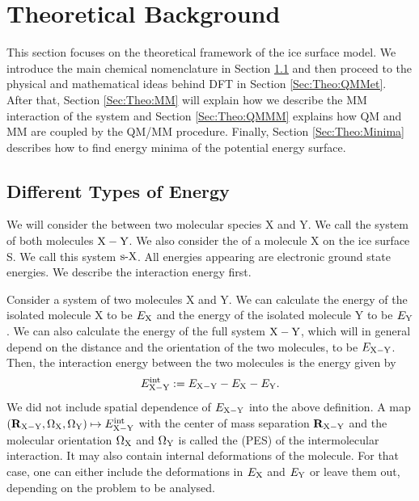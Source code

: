 \documentclass[8.5pt,twoside,twocolumn]{article}
\newcommand\eint{\enmat{E^{\te{int}}}}
\newcommand\sur{\enmat{\te{s-}}}
\theoremstyle{standard}
\begin{document}
\section{Theoretical Background}
\label{Sec:Theo}
This section focuses on the theoretical framework of the ice surface model. We introduce the main chemical
nomenclature in Section \ref{Sec:Theo:Interaction} and then proceed to the
physical and mathematical ideas behind DFT in Section \ref{Sec:Theo:QMMet}.
After that, Section \ref{Sec:Theo:MM} will explain how we describe the MM
interaction of the system and Section \ref{Sec:Theo:QMMM} explains how QM and
MM are coupled by the QM/MM procedure. Finally, Section \ref{Sec:Theo:Minima}
describes how to find energy minima of the potential energy surface.

\newcommand\X{\enmat{\te X}}
\newcommand\Y{\enmat{\te Y}}
\newcommand\Z{\enmat{\te Z}}
\newcommand\XY{{\enmat{{\X - \Y}}}}
\renewcommand\S{\enmat{\te S}}
\newcommand\sX{\enmat{{\sur\te{X}}}}
\newcommand\A{\enmat{\te A}}
\subsection{Different Types of Energy}
\label{Sec:Theo:Interaction}
We will consider the  between two molecular species X and Y. We call
the system of both molecules $\XY$. We also consider the  of a molecule X on
the ice surface S. We call this system $\sX$. All energies appearing are
electronic ground state energies. We describe the interaction energy first.

Consider a system of two molecules X and Y. We can calculate the energy of the isolated molecule X to
be $E_{\text X}$ and the energy of the isolated molecule Y to be $E_{\text Y}$. We can also calculate the 
energy of the full system $\XY$, which will in general depend on the distance and the orientation
of the two molecules, to be $E_{\XY}$. Then, the interaction energy between the two molecules
is the energy given by
\begin{equation}
 \eint_{\XY} := E_{\XY} - E_\X - E_\Y.
 \label{Theo:InteractionEnergy}
\end{equation}
We did not include spatial dependence of $E_{\XY}$ into the above definition. A
map \mbox{$(\bo R_\XY, \Om_\X, \Om_\Y) \mapsto \eint_\XY$} with the center of
mass separation $\bo R_\XY$ and the molecular orientation $\Om_\X$ and $\Om_\Y$
is called the  (PES) of the intermolecular interaction. It may also contain internal deformations of
the molecule. For that case, one can either include the deformations in $E_\X$
and $E_\Y$ or leave them out, depending on the problem to be analysed.
\end{document}
